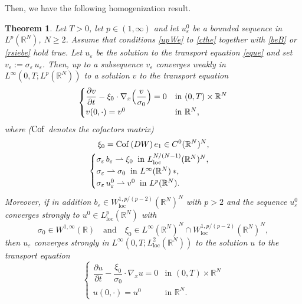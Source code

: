 \documentclass[JEP,XML,SOM,Unicode]{cedram}
\newcommand{\loc}{\mathrm{loc}}
\newcommand{\spfrac}[2]{{#1}/{(#2)}}
\def \RR {\mathbb R}
\theoremstyle{plain}
\newtheorem{Thm}{Theorem}[section]
\theoremstyle{definition}
\begin{document}
Then, we have the following homogenization result.
\begin{Thm}\label{thm.hom}
Let $T>0$, let $p\in(1,\infty)$ and let $u_\varepsilon^0$ be a bounded sequence in $L^p(\RR^N)$, $N\geq 2$. Assume that conditions \eqref{upWe} to \eqref{cthe} together with \eqref{beB} or \eqref{rsiebe} hold true.
Let $u_\varepsilon$ be the solution to the transport equation \eqref{eque} and set $v_\varepsilon:=\sigma_\varepsilon\,u_\varepsilon$.
Then, up to a subsequence $v_\varepsilon$ converges weakly in $L^\infty(0,T;L^p(\RR^N))$ to a solution $v$ to the transport equation
\begin{equation}\label{eqv}
\begin{cases}
\dfrac{\partial v}{\partial t}-\xi_0\cdot\nabla_x\Bigl(\dfrac{v}{\sigma_0}\Bigr)=0 & \mbox{in }(0,T)\times\RR^N
\\
v(0,\cdot)=v^0 & \mbox{in }\RR^N,
\end{cases}
\end{equation}
where (${\rm Cof}$ denotes the cofactors matrix)
\begin{gather}\label{xi0cofDW}
\xi_0={\rm Cof}\,(DW)\,e_1\in C^0(\RR^N)^N,
\\
\label{xisiv0}
\begin{cases}
\sigma_\varepsilon\,b_\varepsilon\rightharpoonup \xi_0\;\;\mbox{in }L^{\spfrac{N}{N-1}}_\loc(\RR^N)^N,\\
\sigma_\varepsilon\rightharpoonup\sigma_0\;\;\mbox{in }L^\infty(\RR^N)\,\ast,\\
\sigma_\varepsilon\,u_\varepsilon^0\rightharpoonup v^0\;\;\mbox{in }L^p(\RR^N).
\end{cases}
\end{gather}
Moreover, if in addition $b_\varepsilon\in W^{1,p/(p-2)}_\loc(\RR^N)^N$ with $p>2$ and the sequence $u_\varepsilon^0$ converges strongly to $u^0\in L^p_\loc(\RR^N)$ with
\[
\sigma_0\in W^{1,\infty}(\RR)\quad\text{and}\quad\xi_0\in L^\infty(\RR^N)^N\cap W^{1,p/(p-2)}_\loc(\RR^N)^N,
\]
then $u_\varepsilon$ converges strongly in $L^\infty(0,T;L^2_\loc(\RR^N))$ to the solution $u$ to the transport equation
\begin{equation}\label{equ}
\begin{cases}
\dfrac{\partial u}{\partial t}-\dfrac{\xi_0}{\sigma_0}\cdot\nabla_x u=0 & \mbox{in }(0,T)\times\RR^N
\\[5pt]
u(0,\cdot)=u^0 & \mbox{in }\RR^N.
\end{cases}
\end{equation}
\end{Thm}
\end{document}
